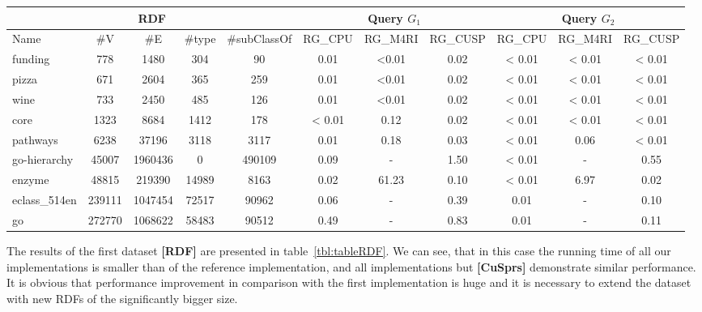 {\setlength{\tabcolsep}{0.4em}
\begin{table*}
\caption{RDFs querying results}
\label{tbl:tableRDF}
\begin{tabular}{| p{1.5cm} | c | c |c | c | c | c | c | c | c | c |}
    \hline
    \multicolumn{5}{|c|}{RDF}        & \multicolumn{3}{|c|}{Query $G_1$}                               & \multicolumn{3}{|c|}{Query $G_2$} \\
    \hline
    Name                  & \#V    & \#E     & \#type &\#subClassOf & RG\_CPU & RG\_M4RI  & RG\_CUSP   & RG\_CPU & RG\_M4RI  & RG\_CUSP \\
    \hline
    \hline
    \small{funding}       & 778    & 1480    & 304   & 90           & 0.01      & <0.01   & 0.02       & < 0.01  & < 0.01    & < 0.01    \\
    \small{pizza}         & 671    & 2604    & 365   & 259          & 0.01      & <0.01   & 0.02       & < 0.01  & < 0.01    & < 0.01    \\
    \small{wine}          & 733    & 2450    & 485   & 126          & 0.01      & <0.01   & 0.02       & < 0.01  & < 0.01    & < 0.01    \\
    \small{core}          & 1323   & 8684    & 1412  & 178          & < 0.01    & 0.12    & 0.02       & < 0.01  & < 0.01    & < 0.01    \\
    \small{pathways}      & 6238   & 37196   & 3118  & 3117         & 0.01      & 0.18    & 0.03       & < 0.01  & 0.06      & < 0.01    \\
    \small{go-hierarchy}  & 45007  & 1960436 & 0     & 490109       & 0.09      & -       & 1.50       & < 0.01  & -         & 0.55      \\
    \small{enzyme}        & 48815  & 219390  & 14989 & 8163         & 0.02      & 61.23   & 0.10       & < 0.01  & 6.97      & 0.02      \\
    \small{eclass\_514en} & 239111 & 1047454 & 72517 & 90962        & 0.06      & -       & 0.39       & 0.01    & -         & 0.10      \\
    \small{go}            & 272770 & 1068622 & 58483 & 90512        & 0.49      & -       & 0.83       & 0.01    & -         & 0.11      \\
    \hline
  \end{tabular}
\end{table*}
}


The results of the first dataset \textbf{[RDF]} are presented in table~\ref{tbl:tableRDF}.
We can see, that in this case the running time of all our implementations is smaller than of the reference implementation, and all implementations but \textbf{[CuSprs]} demonstrate similar performance.
It is obvious that performance improvement in comparison with the first implementation is huge and it is necessary to extend the dataset with new RDFs of the significantly bigger size.

